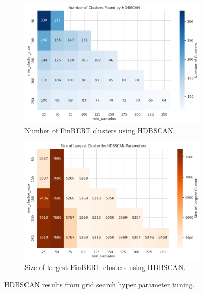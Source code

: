 \documentclass[twocolumn]{article}
\begin{document}
\begin{figure}[h!]
    \centering
    \begin{subfigure}[t]{0.49\textwidth}
        \centering
        \includegraphics[width=\textwidth]{finbert_hdbscan_clusters.png}
        \caption{Number of FinBERT clusters using HDBSCAN.}
        \label{fig:finbert-cluster-num}
    \end{subfigure}
    \hfill
    \begin{subfigure}[t]{0.49\textwidth}
        \centering
        \includegraphics[width=\textwidth]{finbert_hdbscan_largest_cluster.png}
        \caption{Size of largest FinBERT clusters using HDBSCAN.}
        \label{fig:finbert-cluster-size}
    \end{subfigure}


    \caption{HDBSCAN results from grid search hyper parameter tuning.}
    \label{fig:finbert-tuning}
\end{figure}
\end{document}
